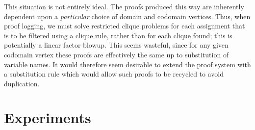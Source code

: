 \documentclass{article}
\begin{document}
This situation is not entirely ideal. The proofs produced this way are inherently dependent upon a
\emph{particular} choice of domain and codomain vertices. Thus, when proof logging, we must solve
restricted clique problems for each assignment that is to be filtered using a clique rule, rather
than for each clique found; this is potentially a linear factor blowup.  This seems wasteful, since
for any given codomain vertex these proofs are effectively the same up to substitution of variable
names. It would therefore seem desirable to extend the proof system with a substitution rule which
would allow such proofs to be recycled to avoid duplication.

\section{Experiments}
\end{document}
